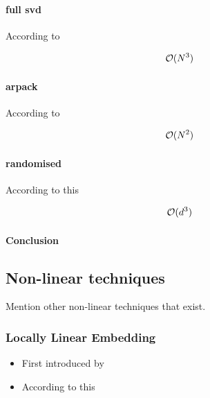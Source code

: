 \clearpage

\paragraph{full \gls{svd}}

According to \cite{wright2001large}

$$\mathcal{O}(N^3)$$

\clearpage

\paragraph{\gls{arpack}}

According to \cite{wright2001large}

$$\mathcal{O}(N^2)$$

\clearpage

\paragraph{randomised}

According to this \cite{HandsOnMLCh8}

$$\mathcal{O}(d^3)$$


\clearpage

\paragraph{Conclusion}



\clearpage








\subsection{Non-linear techniques}

Mention other non-linear techniques that exist.

\subsubsection{Locally Linear Embedding}

\begin{itemize}
	\item First introduced by \cite{roweis2000nonlinear}
	\item According to this \cite{DRUnsupervisedNearestNeighbors}
\end{itemize}

